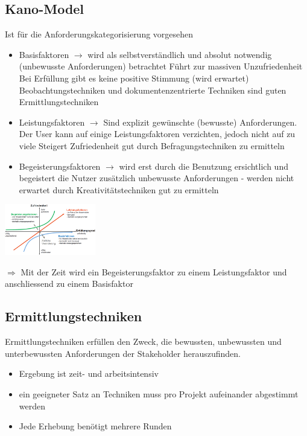 \documentclass{report}
\newenvironment{Figure}
	{\par\medskip\noindent\minipage{\linewidth}}
	{\endminipage\par\medskip}
\theoremstyle{definition}
\theoremstyle{example}
\begin{document}
\subsection{Kano-Model}
Ist für die Anforderungskategorisierung vorgesehen

\begin{itemize}
   \item Basisfaktoren $\rightarrow$ wird als selbstverständlich und absolut notwendig (unbewusste Anforderungen) betrachtet
   \subitem Führt zur massiven Unzufriedenheit
   \subitem Bei Erfüllung gibt es keine positive Stimmung (wird erwartet)
   \subitem Beobachtungstechniken und dokumentenzentrierte Techniken sind guten Ermittlungstechniken
   \item Leistungsfaktoren $\rightarrow$ Sind explizit gewünschte (bewusste) Anforderungen. Der User kann auf einige Leistungsfaktoren verzichten, jedoch nicht auf zu viele
   \subitem Steigert Zufriedenheit
   \subitem gut durch Befragungstechniken zu ermitteln
   \item Begeisterungsfaktoren $\rightarrow$ wird erst durch die Benutzung ersichtlich und begeistert die Nutzer zusätzlich
   \subitem unbewusste Anforderungen - werden nicht erwartet
   \subitem durch Kreativitätstechniken gut zu ermitteln 
\end{itemize}

\begin{Figure}
   \centering
    \includegraphics[width=150px]{img/KanoModell.png}
        \label{fig:Ansicht der verschiedenen Anforderungskategorisierung}
\end{Figure}
$\Rightarrow$ Mit der Zeit wird ein Begeisterungsfaktor zu einem Leistungsfaktor und anschliessend zu einem Basisfaktor

\subsection{Ermittlungstechniken}
Ermittlungstechniken erfüllen den Zweck, die bewussten, unbewussten und unterbewussten Anforderungen der Stakeholder herauszufinden.
\begin{itemize}
   \item Ergebung ist zeit- und arbeitsintensiv
   \item ein geeigneter Satz an Techniken muss pro Projekt aufeinander abgestimmt werden
   \item Jede Erhebung benötigt mehrere Runden
\end{itemize}
\end{document}
